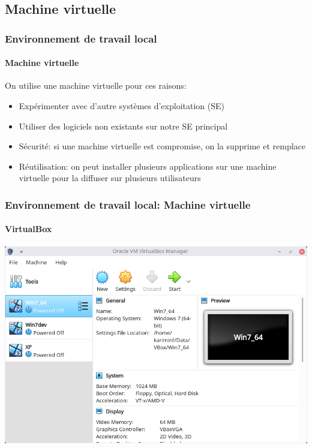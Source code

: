 \documentclass[xcolor=table]{beamer}
\begin{document}
\subsection{Machine virtuelle}

\begin{frame}
\frametitle{Environnement de travail local}
\framesubtitle{Machine virtuelle}

On utilise une machine virtuelle pour ces raisons:
\begin{itemize}
	\item Expérimenter avec d'autre systèmes d'exploitation (SE)
	\item Utiliser des logiciels non existants sur notre SE principal
	\item Sécurité: si une machine virtuelle est compromise, on la supprime et remplace
	\item Réutilisation: on peut installer plusieurs applications sur une machine virtuelle pour la diffuser sur plusieurs utilisateurs 
\end{itemize}

\end{frame}

\begin{frame}
\frametitle{Environnement de travail local: Machine virtuelle}
\framesubtitle{VirtualBox}

\begin{center}
	\includegraphics[height=
.8\textheight]{../img/Bweb01-environnement/vbox.png}
\end{center}

\end{frame}
\end{document}
